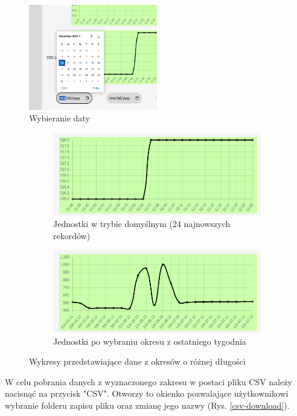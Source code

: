 \begin{figure}[H]
    \centering
    \includegraphics[width=0.5\textwidth]{zdj/app/date-pick.png}
    \caption{Wybieranie daty}
    \label{pick-date}
\end{figure}

\begin{figure}[H]
    \centering
    \begin{subfigure}{0.7\textwidth}
        \centering
        \includegraphics[width=\linewidth]{zdj/app/time-unit1.png}
        \caption{Jednostki w trybie domyślnym (24 najnowszych rekordów)}
    \end{subfigure}
    \begin{subfigure}{0.7\textwidth}
        \centering
        \includegraphics[width=\linewidth]{zdj/app/time-unit2.png}
        \caption{Jednostki po wybraniu okresu z ostatniego tygodnia}
    \end{subfigure}
       
    \caption{Wykresy przedstawiające dane z okresów o różnej długości}
    \label{diff-time}
\end{figure}
W celu pobrania danych z wyznaczonego zakresu w postaci pliku CSV należy nacisnąć na przycisk "CSV". Otworzy to okienko pozwalające użytkownikowi wybranie folderu
zapisu pliku oraz zmianę jego nazwy (Rys. \ref{csv-download}). 

